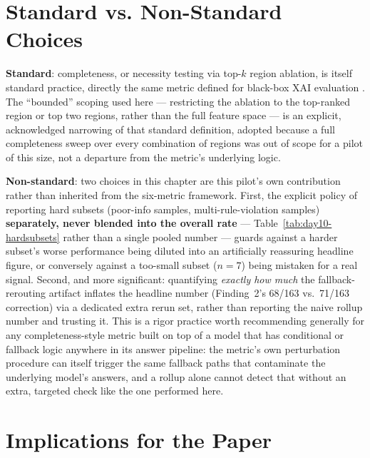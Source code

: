 \section{Standard vs. Non-Standard Choices}

\textbf{Standard}: completeness, or necessity testing via top-$k$ region ablation, is itself standard
practice, directly the same metric defined for black-box XAI evaluation \citep{arreche2024exai}. The
``bounded'' scoping used here --- restricting the ablation to the top-ranked region or top two regions,
rather than the full feature space --- is an explicit, acknowledged narrowing of that standard
definition, adopted because a full completeness sweep over every combination of regions was out of
scope for a pilot of this size, not a departure from the metric's underlying logic.

\textbf{Non-standard}: two choices in this chapter are this pilot's own contribution rather than
inherited from the six-metric framework. First, the explicit policy of reporting hard subsets (poor-info
samples, multi-rule-violation samples) \textbf{separately, never blended into the overall rate} ---
Table~\ref{tab:day10-hardsubsets} rather than a single pooled number --- guards against a harder subset's
worse performance being diluted into an artificially reassuring headline figure, or conversely against a
too-small subset ($n=7$) being mistaken for a real signal. Second, and more significant: quantifying
\emph{exactly how much} the fallback-rerouting artifact inflates the headline number (Finding~2's
68/163 vs.\ 71/163 correction) via a dedicated extra rerun set, rather than reporting the naive rollup
number and trusting it. This is a rigor practice worth recommending generally for any completeness-style
metric built on top of a model that has conditional or fallback logic anywhere in its answer pipeline:
the metric's own perturbation procedure can itself trigger the same fallback paths that contaminate the
underlying model's answers, and a rollup alone cannot detect that without an extra, targeted check like
the one performed here.

\section{Implications for the Paper}

